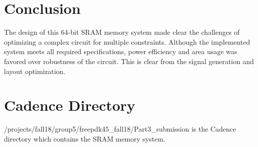\documentclass[conference]{IEEEtran}
\begin{document}
\section{Conclusion}
The design of this 64-bit SRAM memory system made clear the challenges of optimizing a complex circuit for multiple constraints. Although the implemented system meets all required specifications, power efficiency and area usage was favored over robustness of the circuit. This is clear from the signal generation and layout optimization. 

\section{Cadence Directory}
/projects/fall18/group5/freepdk45\_fall18/Part3\_submission is the Cadence directory which contains the SRAM memory system. 
\end{document}
